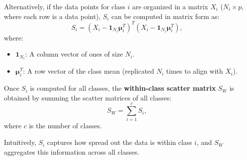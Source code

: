 \documentclass[10pt]{article}
\begin{document}
\noindent Alternatively, if the data points for class \(i\) are organized in a matrix \( X_i \) (\(N_i \times p\), where each row is a data point), \( S_i \) can be computed in matrix form as:
\[
S_i = (X_i - \boldsymbol{1}_{N_i} \boldsymbol{\mu}_i^T)^T (X_i - \boldsymbol{1}_{N_i} \boldsymbol{\mu}_i^T),
\]
where:
\begin{itemize}
    \item \( \boldsymbol{1}_{N_i} \): A column vector of ones of size \( N_i \).
    \item \( \boldsymbol{\mu}_i^T \): A row vector of the class mean (replicated \( N_i \) times to align with \( X_i \)).
\end{itemize}

\noindent Once \( S_i \) is computed for all classes, the \textbf{within-class scatter matrix} \( S_W \) is obtained by summing the scatter matrices of all classes:
\[
S_W = \sum_{i=1}^c S_i,
\]
where \( c \) is the number of classes.

\noindent Intuitively, \( S_i \) captures how spread out the data is within class \(i\), and \( S_W \) aggregates this information across all classes.
\end{document}
